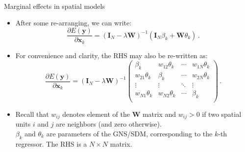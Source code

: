 \documentclass{beamer}
\begin{document}
\begin{frame}{Marginal effects in spatial models}
\begin{itemize}
	\item After some re-arranging, we can write:
\begin{equation*}
\frac{\partial E(\bm{y})}{\partial \bm{x}_k}
    =(\bm{I}_N-\lambda \bm{W})^{-1} (\bm{I}_N \beta_k + \bm{W} \theta_k)\,.
\end{equation*}
\item 
For convenience and clarity, the RHS may also be re-written as:
\begin{equation*}
\frac{\partial E(\bm{y})}{\partial \bm{x}_k}
    =(\bm{I}_N-\lambda \bm{W})^{-1}
	\begin{pmatrix}
		\beta_{k} & w_{12}\theta_{k}& \cdots & w_{1N}\theta_{k}\\
		w_{21}\theta_{k}& \beta_{k} & \cdots & w_{2N}\theta_{k}\\
		\vdots & \vdots & \ddots & \vdots \\
		w_{N1}\theta_{k} & w_{N2}\theta_{k} & \cdots & \beta_{k} \\
	\end{pmatrix}\,. 
\end{equation*}
\item Recall that $w_{ij}$ denotes element of the $\bm{W}$ matrix and $w_{ij} > 0$ if two spatial units $i$ and $j$ are neighbors (and zero otherwise). \\$\beta_k$ and $\theta_k$ are parameters of the GNS/SDM, corresponding to the $k$-th regressor. The RHS is a $N\!\times\!N$ matrix.
\end{itemize}	
\end{frame}
\end{document}
